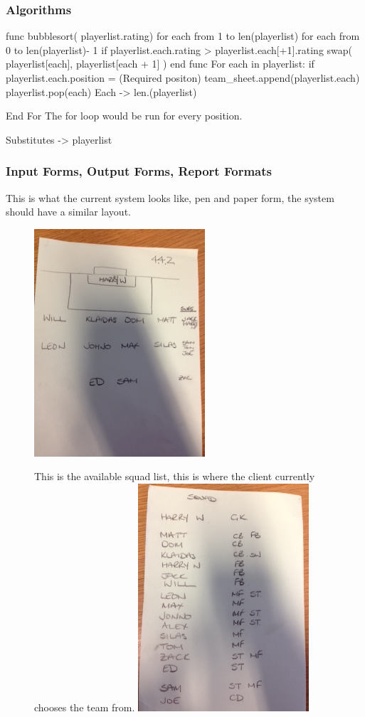 \subsubsection{Algorithms}

func bubblesort( playerlist.rating)
    for each from 1 to len(playerlist)
        for each from 0 to  len(playerlist)- 1
           if playerlist.each.rating > playerlist.each[+1].rating
              swap( playerlist[each], playerlist[each + 1] )
end func
For each in playerlist:
	if playerlist.each.position = (Required positon)\:
		team\_sheet.append(playerlist.each)
		playerlist.pop(each)
		Each -> len.(playerlist)
		
	
End For
The for loop would be run for every position.

Substitutes ->  playerlist 

\subsubsection{Input Forms, Output Forms, Report Formats}
This is what the current system looks like, pen and paper form, the system should have a similar layout.
\begin{figure}[H]
	\includegraphics{formation}
\end{figure}
\begin{figure}[H]
This is the available squad list, this is where the client currently chooses the team from. 
	\includegraphics{squad}
\end{figure}

